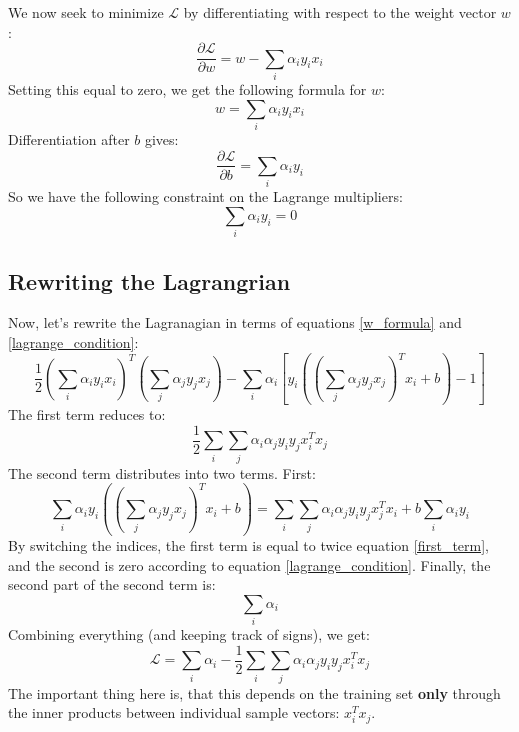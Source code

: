 \documentclass[12pt, a4paper]{article}
\numberwithin{equation}{section}
\begin{document}
We now seek to minimize $\mathcal{L}$ by differentiating with respect to the weight vector $w$:
\begin{equation}
\frac{\partial\mathcal{L}}{\partial w}=w-\sum_i\alpha_i y_i x_i
\end{equation}
Setting this equal to zero, we get the following formula for $w$:
\begin{equation}
\label{w_formula}
w=\sum_i\alpha_i y_i x_i
\end{equation}
Differentiation after $b$ gives:
\begin{equation}
\frac{\partial\mathcal{L}}{\partial b}=\sum_i\alpha_i y_i
\end{equation}
So we have the following constraint on the Lagrange multipliers:
\begin{equation}
\label{lagrange_condition}
\sum_i\alpha_i y_i=0
\end{equation}

\subsection{Rewriting the Lagrangrian}
Now, let's rewrite the Lagranagian in terms of equations \ref{w_formula} and \ref{lagrange_condition}:
\begin{equation}
\frac{1}{2}\left(\sum_i\alpha_i y_i x_i\right)^T\left(\sum_j\alpha_j y_j x_j\right)-\sum_i\alpha_i\left[y_i\left(\left(\sum_j\alpha_j y_j x_j\right)^T x_i + b\right)-1\right]
\end{equation}
The first term reduces to:
\begin{equation}
\label{first_term}
\frac{1}{2}\sum_i\sum_j\alpha_i\alpha_j y_i y_j x_i^T x_j
\end{equation}
The second term distributes into two terms. First:
\begin{equation}
\sum_i\alpha_i y_i\left(\left(\sum_j\alpha_j y_j x_j\right)^T x_i + b\right)=\sum_i\sum_j\alpha_i\alpha_j y_i y_j x_j^T x_i + b\sum_i\alpha_i y_i
\end{equation}
By switching the indices, the first term is equal to twice equation \ref{first_term}, and the second is zero according to equation \ref{lagrange_condition}. Finally, the second part of the second term is:
\begin{equation}
\sum_i\alpha_i
\end{equation}
Combining everything (and keeping track of signs), we get:
\begin{equation}
\label{reduced_lagragian}
\mathcal{L}=\sum_i\alpha_i-\frac{1}{2}\sum_i\sum_j\alpha_i\alpha_j y_i y_j x_i^T x_j
\end{equation}
The important thing here is, that this depends on the training set \textbf{only} through the inner products between individual sample vectors: $x_i^T x_j$.
\end{document}
